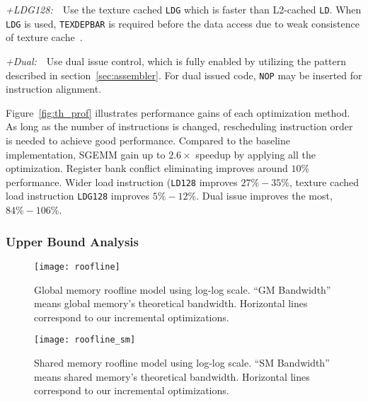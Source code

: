 {\it +LDG128:}~~Use the texture cached {\tt LDG} which is faster than L2-cached {\tt LD}. 
When {\tt LDG} is used, {\tt TEXDEPBAR} is required before the data access due to weak consistence of texture cache~\cite{lukyanov2014efficient}.

{\it +Dual:}~~Use dual issue control, which is fully enabled by utilizing the pattern described in section~\ref{sec:assembler}.
For dual issued code, {\tt NOP} may be inserted for instruction alignment.

Figure~\ref{fig:th_prof} illustrates performance gains of each optimization method.
As long as the number of instructions is changed, rescheduling instruction order is needed to achieve good performance.
Compared to the baseline implementation, SGEMM gain up to $2.6\times$ speedup by applying all the optimization.
Register bank conflict eliminating improves around $10\%$ performance. 
Wider load instruction ({\tt LD128} improves $27\%-35\%$, texture cached
load instruction {\tt LDG128} improves $5\%-12\%$.
Dual issue improves the most, $84\%-106\%$.

\subsubsection{Upper Bound Analysis}

\begin{figure}[htbp]
\begin{center}
\texttt{[image: roofline]}
    \caption{Global memory roofline model using log-log scale. ``GM Bandwidth'' means global memory's theoretical bandwidth. Horizontal lines correspond to our incremental optimizations.}
\label{fig:roofline}
\end{center}
\end{figure}

\begin{figure}[htbp]
\begin{center}
\texttt{[image: roofline\_sm]}
    \caption{Shared memory roofline model using log-log scale. ``SM Bandwidth'' means shared memory's theoretical bandwidth. Horizontal lines correspond to our incremental optimizations.}
\label{fig:roofline}
\end{center}
\end{figure}


